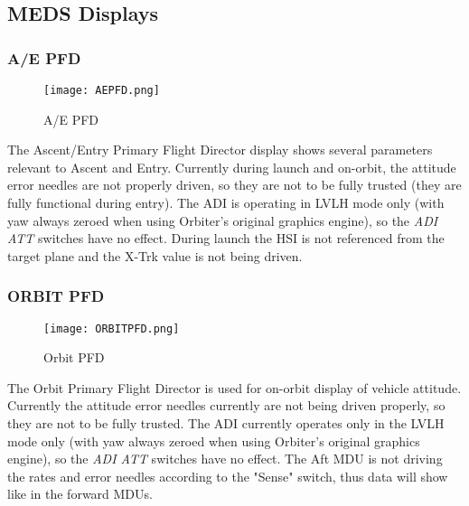 \documentclass[Space_Shuttle_Vessel_Manual.tex]{subfiles}
\begin{document}
\subsection{MEDS Displays}
\begin{multicols*}{2}
\label{sec:meds-displays}

\subsubsection{A/E PFD}
\begin{figure}[H]
  \texttt{[image: AEPFD.png]}
  \caption{A/E PFD}
  \label{fig:AE_PFD}
\end{figure}
The Ascent/Entry Primary Flight Director display shows several parameters relevant to Ascent and Entry. Currently during launch and on-orbit, the attitude error needles are not properly driven, so they are not to be fully trusted (they are fully functional during entry). The ADI is operating in LVLH mode only (with yaw always zeroed when using Orbiter's original graphics engine), so the \textit{ADI ATT} switches have no effect. During launch the HSI is not referenced from the target plane and the X-Trk value is not being driven.

\subsubsection{ORBIT PFD}
\begin{figure}[H]
  \texttt{[image: ORBITPFD.png]}
  \caption{Orbit PFD}
  \label{fig:Orbit_PFD}
\end{figure}
The Orbit Primary Flight Director is used for on-orbit display of vehicle attitude. Currently the attitude error needles currently are not being driven properly, so they are not to be fully trusted. The ADI currently operates only in the LVLH mode only (with yaw always zeroed when using Orbiter's original graphics engine), so the \textit{ADI ATT} switches have no effect. The Aft MDU is not driving the rates and error needles according to the "Sense" switch, thus data will show like in the forward MDUs.
\end{multicols*}
\end{document}
